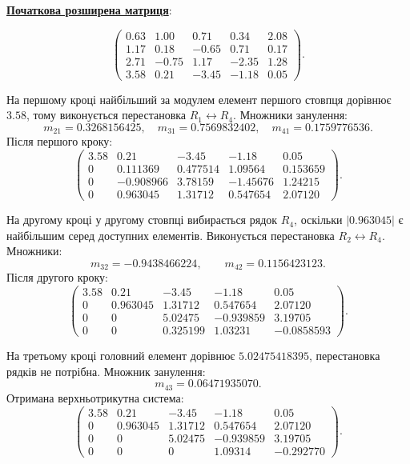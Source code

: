\documentclass[12pt,a4paper]{article}
\begin{document}
    \vspace{1em}

    \noindent
    \textbf{\underline{Початкова розширена матриця}}:

    \[
    \left(
    \begin{array}{rrrr|r}
        0.63 & 1.00 & 0.71 & 0.34 & 2.08 \\
        1.17 & 0.18 & -0.65 & 0.71 & 0.17 \\
        2.71 & -0.75 & 1.17 & -2.35 & 1.28 \\
        3.58 & 0.21 & -3.45 & -1.18 & 0.05
    \end{array}
    \right).
    \]

    \noindent
    На першому кроці найбільший за модулем елемент першого стовпця дорівнює $3.58$, тому
    виконується перестановка $R_1 \leftrightarrow R_4$. Множники занулення:
    \[
        m_{21}=0.3268156425,\quad
        m_{31}=0.7569832402,\quad
        m_{41}=0.1759776536.
    \]
    Після першого кроку:
    \[
    \left(
    \begin{array}{rrrr|r}
        3.58 & 0.21 & -3.45 & -1.18 & 0.05 \\
        0 & 0.111369 & 0.477514 & 1.09564 & 0.153659 \\
        0 & -0.908966 & 3.78159 & -1.45676 & 1.24215 \\
        0 & 0.963045 & 1.31712 & 0.547654 & 2.07120
    \end{array}
    \right).
    \]

    На другому кроці у другому стовпці вибирається рядок $R_4$, оскільки
    $|0.963045|$ є найбільшим серед доступних елементів. Виконується перестановка
    $R_2 \leftrightarrow R_4$. Множники:
    \[
        m_{32}=-0.9438466224,\qquad m_{42}=0.1156423123.
    \]
    Після другого кроку:
    \[
    \left(
    \begin{array}{rrrr|r}
        3.58 & 0.21 & -3.45 & -1.18 & 0.05 \\
        0 & 0.963045 & 1.31712 & 0.547654 & 2.07120 \\
        0 & 0 & 5.02475 & -0.939859 & 3.19705 \\
        0 & 0 & 0.325199 & 1.03231 & -0.0858593
    \end{array}
    \right).
    \]

    На третьому кроці головний елемент дорівнює $5.02475418395$, перестановка рядків не потрібна.
    Множник занулення:
    \[
        m_{43}=0.06471935070.
    \]
    Отримана верхньотрикутна система:
    \[
    \left(
    \begin{array}{rrrr|r}
        3.58 & 0.21 & -3.45 & -1.18 & 0.05 \\
        0 & 0.963045 & 1.31712 & 0.547654 & 2.07120 \\
        0 & 0 & 5.02475 & -0.939859 & 3.19705 \\
        0 & 0 & 0 & 1.09314 & -0.292770
    \end{array}
    \right).
    \]
\end{document}

